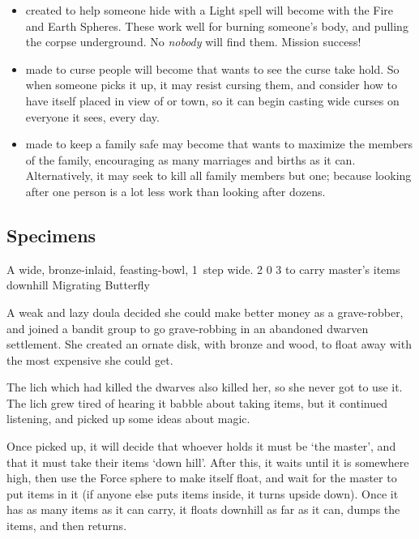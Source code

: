 \begin{multicols}{2}
\begin{itemize}
  \item
   created to help someone hide with a Light spell will become  with the Fire and Earth Spheres.
  These work well for burning someone's body, and pulling the corpse underground.
  No \textit{nobody} will find them.
  Mission success!
  \item
   made to curse people will become  that wants to see the curse take hold.
  So when someone picks it up, it may resist cursing them, and consider how to have itself placed in view of  or town, so it can begin casting wide curses on everyone it sees, every day.
  \item
   made to keep a family safe may become  that wants to maximize the members of the family, encouraging as many marriages and births as it can.
  Alternatively, it may seek to kill all family members but one; because looking after one person is a lot less work than looking after dozens.
\end{itemize}

\subsection{Specimens}

  {A wide, bronze-inlaid, feasting-bowl, 1~\gls{step} wide.}%
  {2}%
  {0}%
  {3}%
  {to carry master's items downhill}%
  {Migrating Butterfly}%
  {
    \setcounter{Fire}{2}
    \setcounter{Earth}{2}
    \setcounter{Water}{2}
    \setcounter{Vigilance}{2}
  }%

A weak and lazy \gls{doula} decided she could make better money as a grave-robber, and joined a bandit group to go grave-robbing in an abandoned dwarven settlement.
She created an ornate disk, with bronze and wood, to float away with the most expensive she could get.

The lich which had killed the dwarves also killed her, so she never got to use it.
The lich grew tired of hearing it babble about taking items, but it continued listening, and picked up some ideas about magic.

Once picked up, it will decide that whoever holds it must be `the master', and that it must take their items `down hill'.
After this, it waits until it is somewhere high, then use the Force sphere to make itself float, and wait for the master to put items in it (if anyone else puts items inside, it turns upside down).
Once it has as many items as it can carry, it floats downhill as far as it can, dumps the items, and then returns.


\end{multicols}
